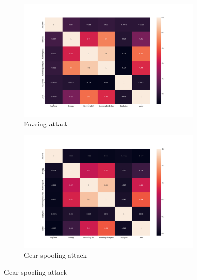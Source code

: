 \begin{figure}
    \centering
    
    \begin{subfigure}[b]{.6\linewidth}
        \centering
        \includegraphics[width = \linewidth]{img/parts/app/feature_correlation/car_hacking/fuzzy.png}
        \caption{Fuzzing attack}
        \label{subfig:apdx_fe_car_hacking_fuzzy}
    \end{subfigure}
    
    \begin{subfigure}[b]{.6\linewidth}
        \centering
        \includegraphics[width = \linewidth]{img/parts/app/feature_correlation/car_hacking/gear.png}
        \caption{Gear spoofing attack}
        \label{subfig:apdx_fe_car_hacking_gear}
    \end{subfigure}
    

\end{figure}

